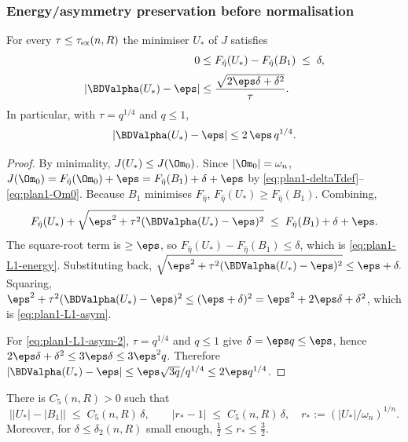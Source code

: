 \subsubsection{Energy/asymmetry preservation before normalisation}
\label{subsubsec:plan1-sel-L1L2}

\begin{lemma}
\label{lem:plan1-sel-L1}
For every $\tau\le\tau_{\rm ex}(n,R)$ the minimiser $U_*$ of $J$
satisfies
\begin{align}
0&\le F_{\hat\eta}(U_*)-F_{\hat\eta}(B_1)\;\le\;\delta,
\label{eq:plan1-L1-energy}\\[2pt]
|\BDValpha(U_*)-\eps|&\le\frac{\sqrt{2\eps\delta+\delta^{2}}}{\tau}.
\label{eq:plan1-L1-asym}
\end{align}
In particular, with $\tau=q^{1/4}$ and $q\le1$,
\begin{equation}\label{eq:plan1-L1-asym-2}
|\BDValpha(U_*)-\eps|\le 2\,\eps\, q^{1/4}.
\end{equation}
\end{lemma}

\begin{proof}
By minimality, $J(U_*)\le J(\Om_0)$. Since $|\Om_0|=\omega_n$,
\(J(\Om_0)=F_{\hat\eta}(\Om_0)+\eps=F_{\hat\eta}(B_1)+\delta+\eps\)
by \eqref{eq:plan1-deltaTdef}--\eqref{eq:plan1-Om0}. Because $B_1$
minimises $F_{\hat\eta}$, $F_{\hat\eta}(U_*)\ge F_{\hat\eta}(B_1)$.
Combining,
\[
F_{\hat\eta}(U_*)
+\sqrt{\eps^{2}+\tau^{2}(\BDValpha(U_*)-\eps)^{2}}
\;\le\;F_{\hat\eta}(B_1)+\delta+\eps.
\]
The square-root term is $\ge \eps$, so
$F_{\hat\eta}(U_*)-F_{\hat\eta}(B_1)\le \delta$, which is
\eqref{eq:plan1-L1-energy}. Substituting back,
\(\sqrt{\eps^{2}+\tau^{2}(\BDValpha(U_*)-\eps)^{2}}\le \eps+\delta.\)
Squaring,
\(\eps^{2}+\tau^{2}(\BDValpha(U_*)-\eps)^{2}\le(\eps+\delta)^{2}
=\eps^{2}+2\eps\delta+\delta^{2}\), which is
\eqref{eq:plan1-L1-asym}.

For \eqref{eq:plan1-L1-asym-2}, $\tau=q^{1/4}$ and $q\le1$ give
$\delta=\eps q\le\eps$, hence $2\eps\delta+\delta^2\le 3\eps\delta\le
3\eps^2 q$. Therefore
$|\BDValpha(U_*)-\eps|\le \eps\sqrt{3q}/q^{1/4}\le 2\eps q^{1/4}$.
\end{proof}

\begin{lemma}
\label{lem:plan1-sel-L2}
There is $C_5(n,R)>0$ such that
\begin{equation}\label{eq:plan1-L2}
\bigl||U_*|-|B_1|\bigr|\;\le\;C_5(n,R)\,\delta,
\qquad
|r_*-1|\;\le\;C_5(n,R)\,\delta,
\quad r_*:=(|U_*|/\omega_n)^{1/n}.
\end{equation}
Moreover, for $\delta\le\delta_2(n,R)$ small enough,
$\tfrac12\le r_*\le \tfrac32$.
\end{lemma}

